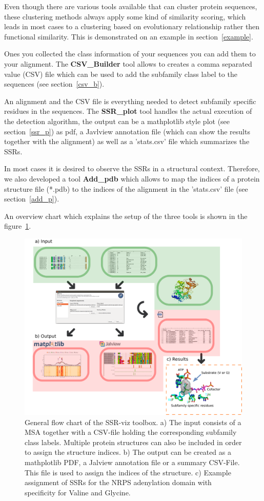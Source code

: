 \documentclass[a4paper,10pt]{article}
\begin{document}
Even though there are various tools available that can cluster protein sequences, 
these clustering methods always apply some kind of similarity scoring,
which leads in most cases to a clustering based on evolutionary relationship 
rather then functional similarity. 
This is demonstrated on an example in section~\ref{example}.

Ones you collected the class information of your sequences you can add
them to your alignment. The \textbf{CSV\_Builder} tool allows to creates 
a comma separated value (CSV) file which can be used to add the subfamily 
class label to the sequences
(see section~\ref{csv_b}).

An alignment and the CSV file is everything needed to 
detect subfamily specific residues in the sequences. 
The \textbf{SSR\_plot} tool handles the actual execution of the detection
algorithm, the output can be a mathplotlib  style plot (see section~\ref{ssr_p})
as pdf, a Javlview annotation file (which can show the results together with the 
alignment) as well as a 'stats.csv' file which summarizes the SSRs.

In most cases it is desired to observe the SSRs in a structural context.
Therefore, we also developed a tool \textbf{Add\_pdb} which allows
to map the indices of a protein structure file (*.pdb) to the indices of the 
alignment in the 'stats.csv' file (see section~\ref{add_p}).

An overview chart which explains the setup of the three tools is shown in
the figure~\ref{fig:flow_chart}.

\begin{figure}
  \includegraphics[width=\linewidth]{./figs/flow_chart}
  \caption{General flow chart of the SSR-viz toolbox. a) The input consists 
of a MSA together with a CSV-file holding the corresponding subfamily class labels. 
Multiple protein structures can also be included in order to assign the 
structure indices. b) The output can be created as a mathplotlib PDF, a Jalview annotation file
or a summary CSV-File. This file is used to assign the indices of the structure.
c) Example assignment of SSRs for the NRPS adenylation domain with specificity for Valine and Glycine.}
  \label{fig:flow_chart}
\end{figure}
\end{document}
